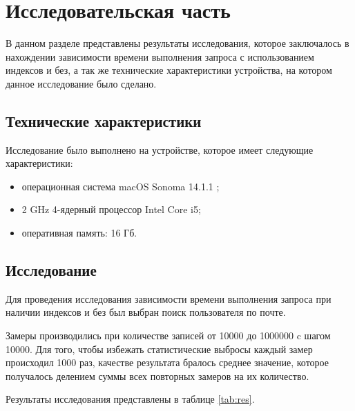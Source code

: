 \chapter{Исследовательская часть}

В данном разделе представлены результаты исследования, которое заключалось в нахождении
зависимости времени выполнения запроса с использованием индексов и без, а так же технические 
характеристики устройства, на котором данное исследование было сделано.

\section{Технические характеристики}

Исследование было выполнено на устройстве, 
которое имеет следующие характеристики:

\begin{itemize}
    \item операционная система macOS Sonoma 14.1.1 \cite{macos};
    \item 2 GHz 4-ядерный процессор Intel Core i5;
    \item оперативная память: 16 Гб.
\end{itemize}

\section{Исследование}

Для проведения исследования зависимости времени выполнения запроса при наличии индексов и без
был выбран поиск пользователя по почте.

Замеры производились при количестве записей от 10000 до 1000000 c шагом 10000. Для того, чтобы 
избежать статистические выбросы каждый замер происходил 1000 раз, качестве результата
бралось среднее значение, которое получалось делением суммы всех повторных замеров на их количество.

Результаты исследования представлены в таблице \ref{tab:res}.

\clearpage

